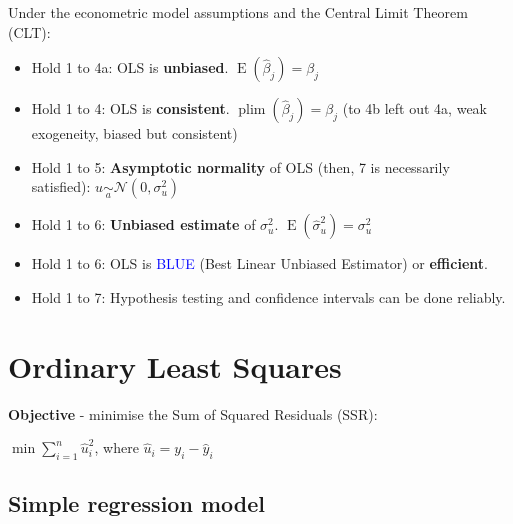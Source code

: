 \documentclass[10pt, a4paper, landscape]{article}
\DeclareMathOperator{\E}{E}
\begin{document}
\begin{multicols}{3}
Under the econometric model assumptions and the Central Limit Theorem (CLT):

\begin{itemize}[leftmargin=*]
	\item Hold 1 to 4a: OLS is \textbf{unbiased}. \( \E(\hat{\beta}_{j}) = \beta_{j} \)
	\item Hold 1 to 4: OLS is \textbf{consistent}. \( \operatorname{plim}(\hat{\beta}_{j}) = \beta_{j} \) (to 4b left out 4a, weak exogeneity, biased but consistent)
	\item Hold 1 to 5: \textbf{Asymptotic normality} of OLS (then, 7 is necessarily satisfied): \( u \underset{a}{\sim} \mathcal{N} (0, \sigma_{u}^{2}) \)
	\item Hold 1 to 6: \textbf{Unbiased estimate} of \( \sigma_{u}^{2} \). \( \E(\hat{\sigma}_{u}^{2}) = \sigma_{u}^{2} \)
	\item Hold 1 to 6: OLS is \textcolor{blue}{BLUE} (Best Linear Unbiased Estimator) or \textbf{efficient}.
	\item Hold 1 to 7: Hypothesis testing and confidence intervals can be done reliably.
\end{itemize}

\columnbreak

\section*{Ordinary Least Squares}

\textbf{Objective} - minimise the Sum of Squared Residuals (SSR):

\begin{center}
	\( \min \sum_{i = 1}^{n} \hat{u}_{i}^{2} \), where \( \hat{u}_{i} = y_{i} - \hat{y}_{i} \)
\end{center}

\subsection*{Simple regression model}

\setlength{\multicolsep}{2pt}
\setlength{\columnsep}{-40pt}
\begin{multicols}{2}



\end{multicols}
\end{multicols}
\end{document}
